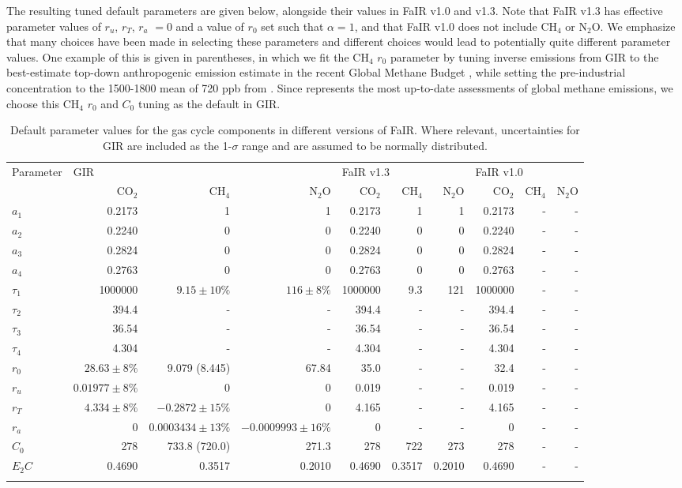 \documentclass[gmd, manuscript]{copernicus}
\begin{document}
The resulting tuned default parameters are given below, alongside their values in FaIR v1.0 and v1.3. Note that FaIR v1.3 has effective parameter values of $r_u$, $r_T$, $r_a$ $=0$  and a value of $r_0$ set such that $\alpha=1$, and that FaIR v1.0 does not include CH$_4$ or N$_2$O. We emphasize that many choices have been made in selecting these parameters and different choices would lead to potentially quite different parameter values. One example of this is given in parentheses, in which we fit the CH$_4$ $r_0$ parameter by tuning inverse emissions from GIR to the best-estimate top-down anthropogenic emission estimate in the recent Global Methane Budget \citep{Saunois}, while setting the pre-industrial concentration to the 1500-1800 mean of 720 ppb from \cite{Meinshausen2017}. Since \cite{Saunois} represents the most up-to-date assessments of global methane emissions, we choose this CH$_4$ $r_0$ and $C_0$ tuning as the default in GIR.
\begin{table}[t]
\caption{Default parameter values for the gas cycle components in different versions of FaIR. Where relevant, uncertainties for GIR are included as the 1-$\sigma$ range and are assumed to be normally distributed.} \label{tab:gasparameters}
\begin{tabular}{l r r r r r r r r r}
\tophline
Parameter & \multicolumn{3}{l}{GIR} & \multicolumn{3}{l}{FaIR v1.3} & \multicolumn{3}{l}{FaIR v1.0}\\
\middlehline
& CO$_2$ & CH$_4$ & N$_2$O & CO$_2$ & CH$_4$ & N$_2$O & CO$_2$ & CH$_4$ & N$_2$O\\
\middlehline
$a_1$ & 0.2173 & 1 & 1 & 0.2173 & 1 & 1 & 0.2173 & - & - \\
$a_2$ & 0.2240 & 0 & 0 & 0.2240 & 0 & 0 & 0.2240 & - & - \\
$a_3$ & 0.2824  & 0 & 0 & 0.2824 & 0 & 0 & 0.2824 & - & - \\
$a_4$ & 0.2763 & 0 & 0 & 0.2763 & 0 & 0 & 0.2763 & - & - \\
$\tau_1$ & 1000000 & $9.15 \pm 10\%$ & $116 \pm 8\%$ & 1000000 & 9.3 & 121 & 1000000 & - & - \\
$\tau_2$ & 394.4 & - & - & 394.4 & - & - & 394.4 & - & - \\
$\tau_3$ & 36.54 & - & - & 36.54 & - & - & 36.54 & - & - \\
$\tau_4$ & 4.304 & - & - & 4.304 & - & - & 4.304 & - & - \\
$r_0$ & $28.63 \pm 8\%$ & 9.079 (8.445) & 67.84 & 35.0 & - & - & 32.4 & - & - \\
$r_u$ & $0.01977 \pm 8\%$ & 0 & 0 & 0.019 & - & - & 0.019 & - & - \\
$r_T$ & $4.334 \pm 8\%$ & $-0.2872 \pm 15\%$ & 0 & 4.165 & - & - & 4.165 & - & - \\
$r_a$ & 0 & $0.0003434 \pm 13\%$ & $-0.0009993 \pm 16\%$ & 0 & - & - & 0 & - & - \\
$C_0$ & 278 & 733.8 (720.0) & 271.3 & 278 & 722 & 273 & 278 & - & - \\
$E_2C$ & 0.4690 & 0.3517 & 0.2010 & 0.4690 & 0.3517 & 0.2010 & 0.4690 & - & - \\
\bottomhline
\end{tabular}
\belowtable{} %
\end{table}
\end{document}
